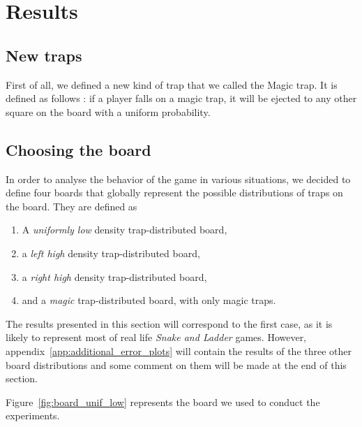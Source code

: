\section{Results} %
\label{sec:results}

\subsection{New traps} %
\label{sub:new_traps}
First of all, we defined a new kind of trap that we called the Magic trap. 
It is defined as follows : if a player falls on a magic trap, it will
be ejected to any other square on the board with a uniform probability. 


\subsection{Choosing the board} %
\label{sub:choosing_the_board}
In order to analyse the behavior of the game in various situations,
we decided to define four boards that globally represent the possible
distributions of traps on the board. They are defined as
\begin{enumerate}
  \item A \emph{uniformly low} density trap-distributed board,
  \item a \emph{left high} density trap-distributed board,
  \item a \emph{right high} density trap-distributed board,
  \item and a \emph{magic} trap-distributed board, with only magic traps.
\end{enumerate}
The results presented in this section will correspond to the first case,
as it is likely to represent most of real life \emph{Snake and Ladder} games.
However, appendix~\ref{app:additional_error_plots} will contain the results
of the three other board distributions and some comment on them will be
made at the end of this section.

Figure~\ref{fig:board_unif_low} represents the board we used to conduct the experiments.

